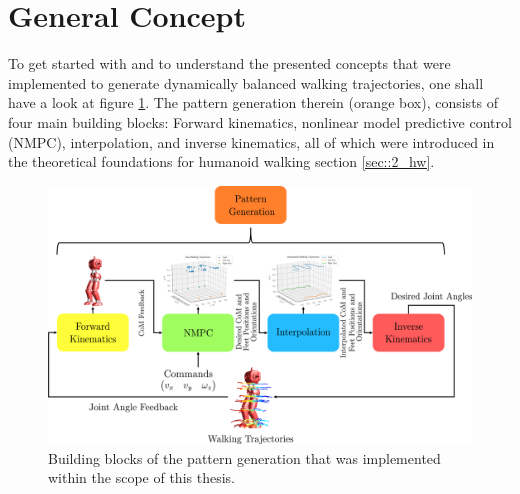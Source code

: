 \FloatBarrier
\section{General Concept}
\label{sec::61_gc}
To get started with and to understand the presented concepts that were implemented to generate dynamically balanced walking trajectories, one shall have a look at figure \ref{fig::61_pg}. The pattern generation therein (orange box), consists of four main building blocks: Forward kinematics, nonlinear model predictive control (NMPC), interpolation, and inverse kinematics, all of which were introduced in the theoretical foundations for humanoid walking section \ref{sec::2_hw}.
\begin{figure}[h!]
	\centering
	\includegraphics[scale=.5]{chapters/06_implementation_of_the_walking_pattern_generator/img/pattern_generation.png}
	\caption{Building blocks of the pattern generation that was implemented within the scope of this thesis.}
	\label{fig::61_pg}
\end{figure}
